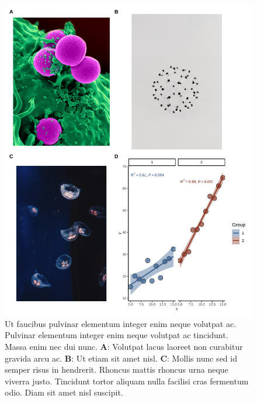 \documentclass[
]{article}
\begin{document}
\begin{figure}

{\centering \includegraphics{Complete_paper_files/figure-latex/results-plot-1} 

}

\caption{Ut faucibus pulvinar elementum integer enim neque volutpat ac. Pulvinar elementum integer enim neque volutpat ac tincidunt. Massa enim nec dui nunc. \textbf{A}: Volutpat lacus laoreet non curabitur gravida arcu ac. \textbf{B}: Ut etiam sit amet nisl. \textbf{C}: Mollis nunc sed id semper risus in hendrerit. Rhoncus mattis rhoncus urna neque viverra justo. Tincidunt tortor aliquam nulla facilisi cras fermentum odio. Diam sit amet nisl suscipit.}\label{fig:results-plot}
\end{figure}
\end{document}
